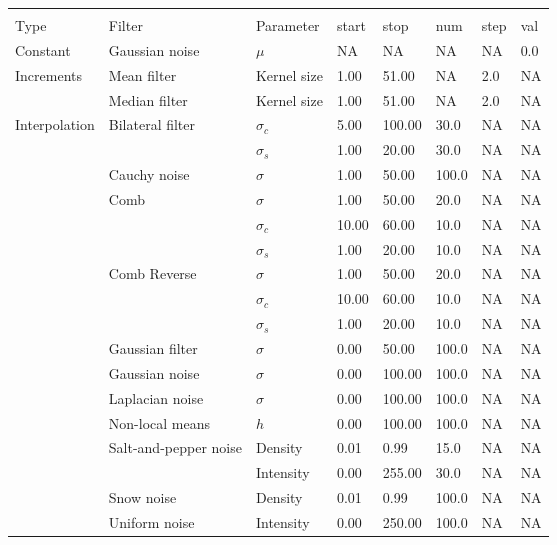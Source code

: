 \begin{tabular}{llllllll}
\toprule
              &               &           &       &        &       &    &    \\
Type & Filter & Parameter & start & stop & num & step & val \\
\midrule
Constant & Gaussian noise & $\mu$ & NA & NA & NA & NA & 0.0 \\
\multirow{2}{*}{Increments} & Mean filter & Kernel size & 1.00  & 51.00  & NA & 2.0 & NA \\
              & Median filter & Kernel size & 1.00  & 51.00  & NA & 2.0 & NA \\
\cline{1-8}
\multirow{17}{*}{Interpolation} & \multirow{2}{*}{Bilateral filter} & $\sigma_c$ & 5.00  & 100.00 & 30.0  & NA & NA \\
              &               & $\sigma_s$ & 1.00  & 20.00  & 30.0  & NA & NA \\
\cline{2-8}
              & Cauchy noise & $\sigma$ & 1.00  & 50.00  & 100.0 & NA & NA \\
              & \multirow{3}{*}{Comb} & $\sigma$ & 1.00  & 50.00  & 20.0  & NA & NA \\
              &               & $\sigma_c$ & 10.00 & 60.00  & 10.0  & NA & NA \\
              &               & $\sigma_s$ & 1.00  & 20.00  & 10.0  & NA & NA \\
\cline{2-8}
              & \multirow{3}{*}{Comb Reverse} & $\sigma$ & 1.00  & 50.00  & 20.0  & NA & NA \\
              &               & $\sigma_c$ & 10.00 & 60.00  & 10.0  & NA & NA \\
              &               & $\sigma_s$ & 1.00  & 20.00  & 10.0  & NA & NA \\
\cline{2-8}
              & Gaussian filter & $\sigma$ & 0.00  & 50.00  & 100.0 & NA & NA \\
              & Gaussian noise & $\sigma$ & 0.00  & 100.00 & 100.0 & NA & NA \\
              & Laplacian noise & $\sigma$ & 0.00  & 100.00 & 100.0 & NA & NA \\
              & Non-local means & $h$ & 0.00  & 100.00 & 100.0 & NA & NA \\
              & \multirow{2}{*}{Salt-and-pepper noise} & Density & 0.01  & 0.99   & 15.0  & NA & NA \\
              &               & Intensity & 0.00  & 255.00 & 30.0  & NA & NA \\
\cline{2-8}
              & Snow noise & Density & 0.01  & 0.99   & 100.0 & NA & NA \\
              & Uniform noise & Intensity & 0.00  & 250.00 & 100.0 & NA & NA \\
\bottomrule
\end{tabular}
